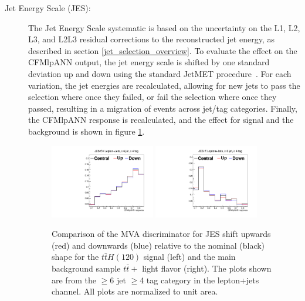 \begin{description}
  \item[Jet Energy Scale (JES):]  The Jet Energy Scale systematic is
    based on the uncertainty on the L1, L2, L3, and L2L3 residual
    corrections to the reconstructed jet energy, as described in
    section \ref{jet_selection_overview}.  To evaluate the effect on
    the CFMlpANN output, the jet energy scale is shifted by one
    standard deviation up and down using the standard JetMET
    procedure~\cite{JESJetMET}.  For each variation, the jet energies 
    are recalculated, allowing for new jets to pass the selection where
    once they failed, or fail the selection where once they passed,
    resulting in a migration of events across jet/tag categories.
    Finally, the CFMlpANN response is recalculated, and the effect for
    signal and the \ttjets background is shown in figure
    \ref{fig:JESShift}. 

\begin{figure}[h]
  \centering
   \includegraphics[width=0.45\textwidth]{Figures/Analysis_1_Diagrams/SystPlot_CMS_scale_j_ttH120_ljets_jge6_tge4.pdf}
   \includegraphics[width=0.45\textwidth]{Figures/Analysis_1_Diagrams/SystPlot_CMS_scale_j_ttbar_ljets_jge6_tge4.pdf}
   \caption{ Comparison of the MVA discriminator for JES shift upwards
     (red) and downwards (blue) relative to the nominal (black) shape
     for the $t\bar{t}H(120)$ signal (left) and the main background sample
     $t\bar{t}+$ light flavor (right).  The plots shown are from the
     $\ge$6 jet $\ge$4 tag category in the lepton+jets channel.  All plots are normalized to unit area.}\label{fig:JESShift}
\end{figure}



\end{description}
